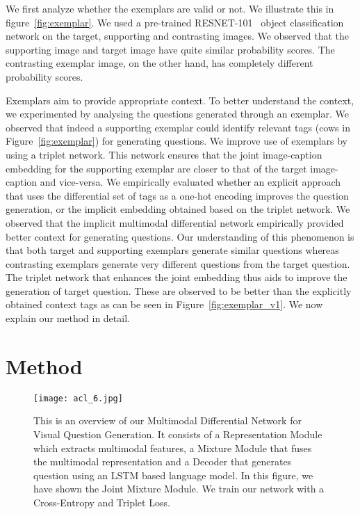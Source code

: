\documentclass[11pt,a4paper]{article}
\begin{document}
 We first analyze whether the exemplars are valid or not. We illustrate this in figure~\ref{fig:exemplar}. We used a pre-trained RESNET-101~\cite{He_CVPR2016} object classification network on the target, supporting and contrasting images. We observed that the supporting image and target image have quite similar probability scores. The contrasting exemplar image, on the other hand, has completely different probability scores.

 Exemplars aim to provide appropriate context. To better understand the context, we experimented by analysing the questions generated through an exemplar. We observed that indeed a supporting exemplar could identify relevant tags (cows in Figure~\ref{fig:exemplar}) for generating questions.
\noindent We improve use of exemplars by using a triplet network. This network ensures that the joint image-caption embedding for the supporting exemplar are closer to that of the
target image-caption and vice-versa.
We empirically evaluated whether an explicit approach that uses the differential set of tags as a one-hot encoding improves the question generation, or the implicit embedding obtained based on the triplet network.
We observed that the implicit multimodal differential network empirically provided better context for generating questions. Our understanding of this phenomenon is that both target and supporting exemplars generate similar questions whereas contrasting exemplars generate very different questions from the target question. The triplet network that enhances the joint embedding thus aids to improve the generation of target question. These are observed to be better than the explicitly obtained context tags as can be seen in Figure~\ref{fig:exemplar_v1}. 
We now explain our method in detail.


\section{Method}
\label{sec:method}
\begin{figure*}[ht]
\centering
\texttt{[image: acl\_6.jpg]}
	\vspace{-0.2cm}
	\caption{This is an overview of our Multimodal Differential Network for Visual Question Generation. It consists of a Representation Module which extracts multimodal features, a Mixture Module that fuses the multimodal representation and a Decoder that generates question using an LSTM based language model. In this figure, we have shown the Joint Mixture Module. We train our network with a Cross-Entropy and Triplet Loss.}
	\label{fig:MDN}
\end{figure*}
\end{document}
